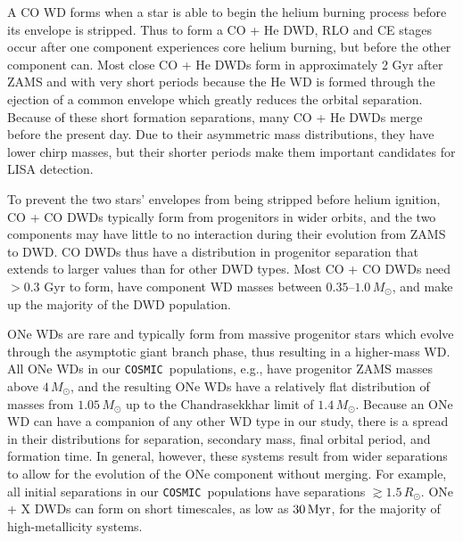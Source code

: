 \documentclass[twocolumn]{aastex631}
\newcommand{\cosmic}{\texttt{COSMIC}}
\begin{document}
A CO WD forms when a star is able to begin the helium burning process before its envelope is stripped. Thus to form a CO + He DWD, RLO and CE stages occur after one component experiences core helium burning, but before the other component can. Most close CO + He DWDs form in approximately 2 Gyr after ZAMS and with very short periods because the He WD is formed through the ejection of a common envelope which greatly reduces the orbital separation. Because of these short formation separations, many CO + He DWDs merge before the present day. Due to their asymmetric mass distributions, they have lower chirp masses, but their shorter periods make them important candidates for LISA detection. 

To prevent the two stars' envelopes from being stripped before helium ignition, CO + CO DWDs typically form from progenitors in wider orbits, and the two components may have little to no interaction during their evolution from ZAMS to DWD. CO DWDs thus have a distribution in progenitor separation that extends to larger values than for other DWD types. Most CO + CO DWDs need $> 0.3$ Gyr to form, have component WD masses between $0.35$--$1.0\,M_\odot$, and make up the majority of the DWD population. 


ONe WDs are rare and typically form from massive progenitor stars which evolve through the asymptotic giant branch phase, thus resulting in a higher-mass WD. All ONe WDs in our \cosmic\ populations, e.g., have progenitor ZAMS masses above $4\,M_\odot$, and the resulting ONe WDs have a relatively flat distribution of masses from $1.05\,M_\odot$ up to the Chandrasekkhar limit of $1.4\,M_\odot$. Because an ONe WD can have a companion of any other WD type in our study, there is a spread in their distributions for separation, secondary mass, final orbital period, and formation time. In general, however, these systems result from wider separations to allow for the evolution of the ONe component without merging. For example, all initial separations in our \cosmic \ populations have separations $\gtrsim 1.5\,R_\odot$. ONe + X DWDs can form on short timescales, as low as $30\,\rm{Myr}$, for the majority of high-metallicity systems. 
\end{document}
